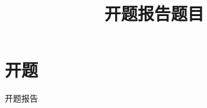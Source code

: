 \documentclass[conference]{IEEEtran}
\renewcommand{\abstractname}{{\hei 摘要}}
\begin{document}
%
\title{开题报告题目}


\author{
\and
{}
}

\maketitle

\iffalse
\begin{abstract}
论文摘要。。。
\end{abstract}

\vskip.2cm

\renewcommand{\abstractname}{{\hei 关键词}}
\begin{abstract}
关键词1；关键词2；关键词3；关键词4
\end{abstract}

\vskip.2cm

\renewcommand{\abstractname}{{\hei 中图法分类号}}
\begin{abstract}
TP319
\end{abstract}

\vskip.2cm

\renewcommand{\abstractname}{Abstract}
\begin{abstract}
Abstract in English...
\end{abstract}

\vskip.2cm

\renewcommand{\abstractname}{Keywords}
\begin{abstract}
Keywords 1，Keywords 2，Keywords 3，Keywords 4
\end{abstract}
\fi

\section{开题}
开题报告
\end{document}
